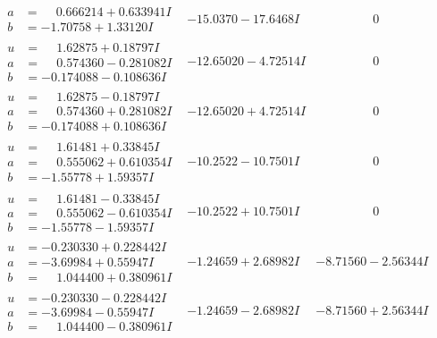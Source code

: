 \documentclass[1p]{elsarticle_modified}
\theoremstyle{definition}
\begin{document}
$$\begin{array}{c|c|c}
\begin{aligned}
a &= \phantom{-}0.666214 + 0.633941 I \\
b &= -1.70758 + 1.33120 I\end{aligned}
 & -15.0370 - 17.6468 I & \phantom{-0.000000 } 0 \\ \hline\begin{aligned}
u &= \phantom{-}1.62875 + 0.18797 I \\
a &= \phantom{-}0.574360 - 0.281082 I \\
b &= -0.174088 - 0.108636 I\end{aligned}
 & -12.65020 - 4.72514 I & \phantom{-0.000000 } 0 \\ \hline\begin{aligned}
u &= \phantom{-}1.62875 - 0.18797 I \\
a &= \phantom{-}0.574360 + 0.281082 I \\
b &= -0.174088 + 0.108636 I\end{aligned}
 & -12.65020 + 4.72514 I & \phantom{-0.000000 } 0 \\ \hline\begin{aligned}
u &= \phantom{-}1.61481 + 0.33845 I \\
a &= \phantom{-}0.555062 + 0.610354 I \\
b &= -1.55778 + 1.59357 I\end{aligned}
 & -10.2522 - 10.7501 I & \phantom{-0.000000 } 0 \\ \hline\begin{aligned}
u &= \phantom{-}1.61481 - 0.33845 I \\
a &= \phantom{-}0.555062 - 0.610354 I \\
b &= -1.55778 - 1.59357 I\end{aligned}
 & -10.2522 + 10.7501 I & \phantom{-0.000000 } 0 \\ \hline\begin{aligned}
u &= -0.230330 + 0.228442 I \\
a &= -3.69984 + 0.55947 I \\
b &= \phantom{-}1.044400 + 0.380961 I\end{aligned}
 & -1.24659 + 2.68982 I & -8.71560 - 2.56344 I \\ \hline\begin{aligned}
u &= -0.230330 - 0.228442 I \\
a &= -3.69984 - 0.55947 I \\
b &= \phantom{-}1.044400 - 0.380961 I\end{aligned}
 & -1.24659 - 2.68982 I & -8.71560 + 2.56344 I \\ \hline\begin{aligned}

\end{aligned}
\end{array}$$
\end{document}

